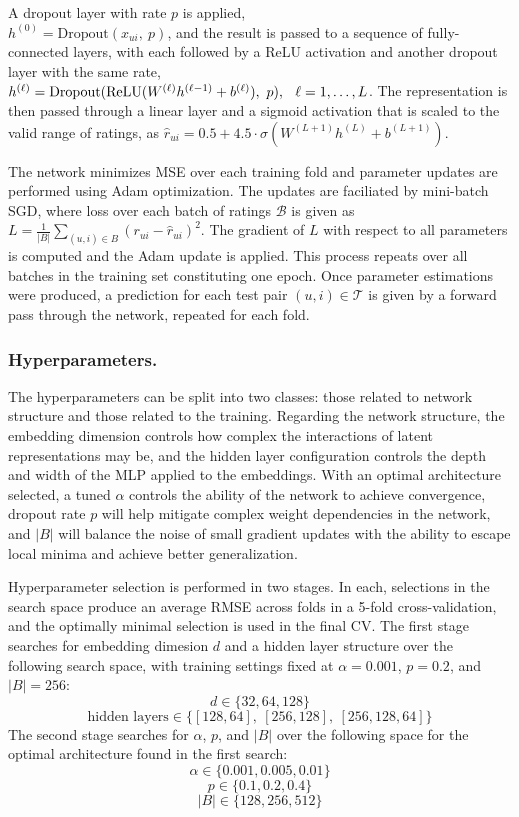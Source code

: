 A dropout layer with rate $ p $ is applied, \\$ h^{(0)} = \text{Dropout}(x_{ui},\ p) $, and the result is passed to a sequence of fully-connected layers, with 
each followed by a ReLU activation and another dropout layer with the 
same rate, $ h^{(\ell)} = \text{Dropout}(\text{ReLU}(W^{(\ell)} h^{(\ell-1)} + b^{(\ell)}),\ p), \hspace{0.1in} \ell = 1, \ldots, L $.
The representation is then passed through a linear layer and a sigmoid activation that is scaled to the valid range of ratings, as
$ \hat{r}_{ui} = 0.5 + 4.5 \cdot \sigma(W^{(L+1)} h^{(L)} + b^{(L+1)}) $.

The network minimizes MSE over each training fold and parameter updates are performed using Adam optimization. The updates are 
faciliated by mini-batch SGD, where loss over each batch of ratings $\mathcal{B}$ is given as $ L = \frac{1}{|B|} \sum_{(u,i) \in B} (r_{ui} - \hat{r}_{ui})^2 $. The gradient of $ L $ with respect to all parameters is computed and the Adam update is applied. This process repeats over all batches in the training 
set constituting one epoch. Once parameter estimations were produced, a prediction for each test pair $(u, i) \in \mathcal{T}$ is given by a forward pass through the network, repeated for each fold.

\subsubsection{Hyperparameters.}

The hyperparameters can be split into two classes: those related to network structure and those related to the training. 
Regarding the network structure, the embedding dimension controls how complex the interactions of latent representations may be, and the hidden layer configuration controls the 
depth and width of the MLP applied to the embeddings. With an optimal architecture selected, a tuned $ \alpha $ controls the ability of the network to achieve convergence, dropout rate $ p $ will help mitigate complex 
weight dependencies in the network, and $ |B| $ will balance the noise of small gradient updates with 
the ability to escape local minima and achieve better generalization.

Hyperparameter selection is performed in two stages. In each, selections in the search space produce an average RMSE across folds in a 5-fold 
cross-validation, and the optimally minimal selection is used in the final CV. The first stage searches for embedding dimesion $ d $ and a hidden layer 
structure over the following search space, with training settings fixed at $\alpha = 0.001$, $p = 0.2$, and $ |B| = 256 $:
$$d \in \{32, 64, 128\}$$
$$\text{hidden layers} \in \{[128, 64],\ [256, 128],\ [256, 128, 64]\}$$
The second stage searches for $ \alpha $, $ p $, and $ |B| $ over the following space for the optimal architecture found in the first search:
$$\alpha \in \{0.001, 0.005, 0.01\}$$
$$p \in \{0.1, 0.2, 0.4\}$$
$$|B| \in \{128, 256, 512\}$$

